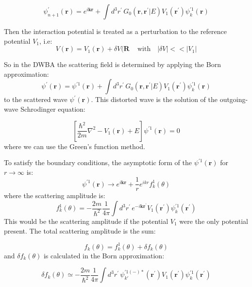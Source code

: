 \begin{equation}
\psi^{'}_{n+1}(\mathbf{r}) = e^{i\mathbf{k}\mathbf{r}} + \int{d^3r^{'}\,G_0(\mathbf{r}, \mathbf{r}^{'} | E)V_1(\mathbf{r}^{'})\psi^{'1}_k(\mathbf{r}) }
\end{equation}

Then the interaction potential is treated as a perturbation to the reference potential $ V_1 $, i.e:
\begin{equation}
V(\mathbf{r}) = V_1(\mathbf{r}) + \delta V(\mathbf{R} \,\,\,\,\,\text{ with }\,\,\,\,\left|\delta V\right| << \left|V_1\right|
\end{equation}

So in the DWBA the scattering field is determined by applying the Born approximation:
\begin{equation}
\psi^{'}(\mathbf{r}) = \psi^{'1}(\mathbf{r}) + \int{d^3r^{'}\,G_0(\mathbf{r}, \mathbf{r}^{'}| E)V_1(\mathbf{r}^{'})\psi^{'1}_k(\mathbf{r}) }
\end{equation}
to the scattered wave $ \psi^{'}(\mathbf{r}) $. This distorted wave is the solution of the outgoing-wave Schrodinger equation:

\begin{equation}
\left[\frac{\hbar^2}{2m}\nabla^2 - V_1(\mathbf{r}) + E \right]\psi^{'1}(\mathbf{r}) = 0
\end{equation}
where we can use the Green's function method.

To satisfy the boundary conditions, the asymptotic form of the $ \psi^{'1}(\mathbf{r}) $ for $ r \rightarrow \infty$  is:
\begin{equation}
\psi^{'1}(\mathbf{r}) \rightarrow e^{i\mathbf{k}\mathbf{r}} + \frac{1}{r} e^{ikr}f^1_k(\theta)
\end{equation}
where the scattering amplitude is:
\begin{equation}
f^1_k(\theta) = -\frac{2m}{\hbar^2}\frac{1}{4\pi}\int{d^3r^{'}\,e^{-i\mathbf{k}\mathbf{r}^{'}}V_1(\mathbf{r}^{'})\psi^{'1}_k(\mathbf{r}^{'})}
\end{equation}
This would be the scattering amplitude if the potential $ V_1 $ were the only potential present. The total scattering amplitude is the sum:

\begin{equation}
f_k(\theta) = f^1_k(\theta) + \delta f_k(\theta)
\end{equation}
and $ \delta f_k(\theta) $ is calculated in the Born approximation:

\begin{equation}\label{fDW}
\delta f_k(\theta) \simeq -\frac{2m}{\hbar^2}\frac{1}{4\pi}\int{d^3r^{'}\,\psi^{'1(-)*}_{k'}(\mathbf{r}^{'})V_1(\mathbf{r}^{'})\psi^{'1}_k(\mathbf{r}^{'})}
\end{equation}

